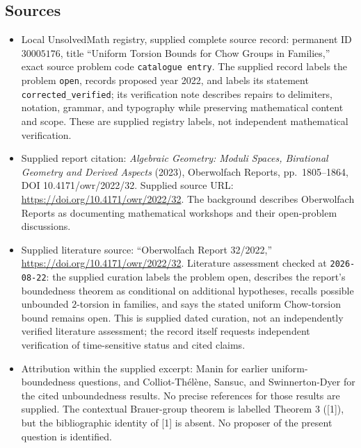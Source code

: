 \documentclass[11pt]{article}
\begin{document}
\subsection{Sources}
\begin{itemize}
\item Local UnsolvedMath registry, supplied complete source record: permanent ID \(30005176\), title ``Uniform Torsion Bounds for Chow Groups in Families,'' exact source problem code \texttt{catalogue entry}. The supplied record labels the problem \texttt{open}, records proposed year 2022, and labels its statement \texttt{corrected\_verified}; its verification note describes repairs to delimiters, notation, grammar, and typography while preserving mathematical content and scope. These are supplied registry labels, not independent mathematical verification.
\item Supplied report citation: \emph{Algebraic Geometry: Moduli Spaces, Birational Geometry and Derived Aspects} (2023), Oberwolfach Reports, pp.\ 1805--1864, DOI 10.4171/owr/2022/32. Supplied source URL: \url{https://doi.org/10.4171/owr/2022/32}. The background describes Oberwolfach Reports as documenting mathematical workshops and their open-problem discussions.
\item Supplied literature source: ``Oberwolfach Report 32/2022,'' \url{https://doi.org/10.4171/owr/2022/32}. Literature assessment checked at \texttt{2026-08-22}: the supplied curation labels the problem open, describes the report's boundedness theorem as conditional on additional hypotheses, recalls possible unbounded \(2\)-torsion in families, and says the stated uniform Chow-torsion bound remains open. This is supplied dated curation, not an independently verified literature assessment; the record itself requests independent verification of time-sensitive status and cited claims.
\item Attribution within the supplied excerpt: Manin for earlier uniform-boundedness questions, and Colliot-Th\'el\`ene, Sansuc, and Swinnerton-Dyer for the cited unboundedness results. No precise references for those results are supplied. The contextual Brauer-group theorem is labelled Theorem 3 ([1]), but the bibliographic identity of [1] is absent. No proposer of the present question is identified.
\end{itemize}
\end{document}
